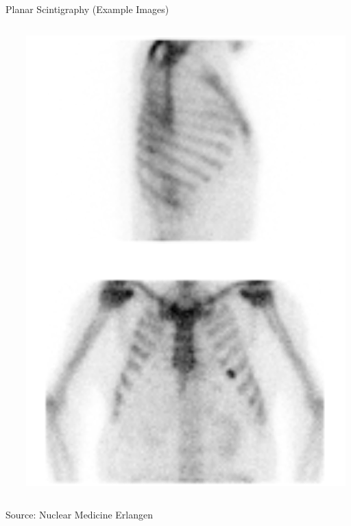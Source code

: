 \begin{frame}{Planar Scintigraphy (Example Images)}
\begin{columns}[T, onlytextwidth]
\begin{column}{0.3\textwidth}
\begin{center}
            \end{center}
        \end{column}
        \begin{column}{0.6\textwidth}
            \begin{center}\includegraphics[height=0.6\textheight]{images/planar}\\
            \end{center}
        \end{column}
    \end{columns}
    \begin{center}
        {\scriptsize Source: Nuclear Medicine Erlangen}\\
    \end{center}
\end{frame}

